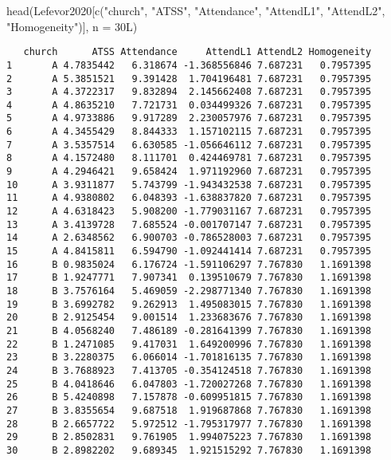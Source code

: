 \documentclass[
  11pt,
]{book}
\newenvironment{Shaded}{\begin{snugshade}}{\end{snugshade}}
\newcommand{\AttributeTok}[1]{\textcolor[rgb]{0.77,0.63,0.00}{#1}}
\newcommand{\FunctionTok}[1]{\textcolor[rgb]{0.00,0.00,0.00}{#1}}
\newcommand{\NormalTok}[1]{#1}
\newcommand{\StringTok}[1]{\textcolor[rgb]{0.31,0.60,0.02}{#1}}
\begin{document}
\begin{Shaded}
\begin{Highlighting}[]
\FunctionTok{head}\NormalTok{(Lefevor2020[}\FunctionTok{c}\NormalTok{(}\StringTok{"church"}\NormalTok{, }\StringTok{"ATSS"}\NormalTok{, }\StringTok{"Attendance"}\NormalTok{, }\StringTok{"AttendL1"}\NormalTok{, }\StringTok{"AttendL2"}\NormalTok{, }\StringTok{"Homogeneity"}\NormalTok{)], }\AttributeTok{n =}\NormalTok{ 30L)}
\end{Highlighting}
\end{Shaded}

\begin{verbatim}
   church      ATSS Attendance     AttendL1 AttendL2 Homogeneity
1       A 4.7835442   6.318674 -1.368556846 7.687231   0.7957395
2       A 5.3851521   9.391428  1.704196481 7.687231   0.7957395
3       A 4.3722317   9.832894  2.145662408 7.687231   0.7957395
4       A 4.8635210   7.721731  0.034499326 7.687231   0.7957395
5       A 4.9733886   9.917289  2.230057976 7.687231   0.7957395
6       A 4.3455429   8.844333  1.157102115 7.687231   0.7957395
7       A 3.5357514   6.630585 -1.056646112 7.687231   0.7957395
8       A 4.1572480   8.111701  0.424469781 7.687231   0.7957395
9       A 4.2946421   9.658424  1.971192960 7.687231   0.7957395
10      A 3.9311877   5.743799 -1.943432538 7.687231   0.7957395
11      A 4.9380802   6.048393 -1.638837820 7.687231   0.7957395
12      A 4.6318423   5.908200 -1.779031167 7.687231   0.7957395
13      A 3.4139728   7.685524 -0.001707147 7.687231   0.7957395
14      A 2.6348562   6.900703 -0.786528003 7.687231   0.7957395
15      A 4.8415811   6.594790 -1.092441414 7.687231   0.7957395
16      B 0.9835024   6.176724 -1.591106297 7.767830   1.1691398
17      B 1.9247771   7.907341  0.139510679 7.767830   1.1691398
18      B 3.7576164   5.469059 -2.298771340 7.767830   1.1691398
19      B 3.6992782   9.262913  1.495083015 7.767830   1.1691398
20      B 2.9125454   9.001514  1.233683676 7.767830   1.1691398
21      B 4.0568240   7.486189 -0.281641399 7.767830   1.1691398
22      B 1.2471085   9.417031  1.649200996 7.767830   1.1691398
23      B 3.2280375   6.066014 -1.701816135 7.767830   1.1691398
24      B 3.7688923   7.413705 -0.354124518 7.767830   1.1691398
25      B 4.0418646   6.047803 -1.720027268 7.767830   1.1691398
26      B 5.4240898   7.157878 -0.609951815 7.767830   1.1691398
27      B 3.8355654   9.687518  1.919687868 7.767830   1.1691398
28      B 2.6657722   5.972512 -1.795317977 7.767830   1.1691398
29      B 2.8502831   9.761905  1.994075223 7.767830   1.1691398
30      B 2.8982202   9.689345  1.921515292 7.767830   1.1691398
\end{verbatim}
\end{document}
